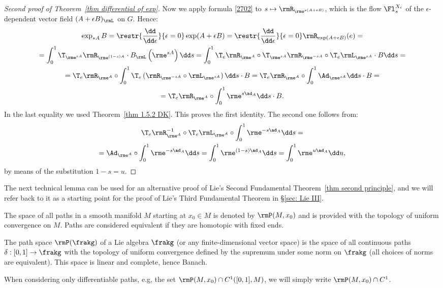 \begin{proof}[Second proof of Theorem~\ref{thm differential of exp}]
    Now we apply formula \eqref{2702} to $s\mapsto \rmR_{\rme^{s(A+\epsilon B)}}$, which is the flow $\Fl^{X_\epsilon}_s$ of the $\epsilon$-dependent vector field $(A+\epsilon B)_\rmL$ on $G$. Hence:
    \begin{multline}
        \exp_{\ast A}B=\restr{\frac{\dd}{\dd \epsilon}}{\epsilon=0}\exp(A+\epsilon B)=\restr{\frac{\dd}{\dd \epsilon}}{\epsilon=0}\rmR_{\exp(A+\epsilon B)}(e)=\\
        =\int_0^1\T_{\rme^{sA}}\rmR_{\rme^{(1-s)A}}\cdot B_\rmL\left(\rme^{sA}\right)\dd s=
        \int_0^1 \T_e \rmR_{\rme^A}\circ \T_{\rme^{sA}}\rmR_{\rme^{-sA}}\circ \T_e \rmL_{\rme^{sA}}\cdot B \dd s=\\
        =\T_e \rmR_{\rme^A}\circ\int_0^1 \T_e\left(\rmR_{\rme^{-sA}}\circ \rmL_{\rme^{sA}}\right)\dd s \cdot B=
        \T_e \rmR_{\rme^A}\circ \int_0^1 \Ad_{\rme^{sA}}\dd s\cdot B=\\
        =\T_e\rmR_{\rme^A}\circ \int_0^1 \rme^{s\ad_A}\dd s\cdot B.
    \end{multline}
    In the last equality we used Theorem~\ref{thm 1.5.2 DK}. This proves the first identity. The second one follows from:
    \begin{multline}
        \T_e \rmR_{\rme^A}^{-1}\circ \T_e\rmL_{\rme^A}\circ \int_0^1 \rme^{-s\ad_A}\dd s=\\
        =\Ad_{\rme^A}\circ\int_0^1 \rme^{-s\ad_A}\dd s=\int_0^1 \rme^{(1-s)\ad_A}\dd s=\int_0^1 \rme^{u\ad_A}\dd u,
    \end{multline}
    by means of the substitution $1-s=u$.
\end{proof}

The next technical lemma can be used for an alternative proof of Lie's Second Fundamental Theorem~\ref{thm second principle}, and we will refer back to it as a starting point for the proof of Lie's Third Fundamental Theorem in \S\ref{sec: Lie III}.

\begin{defn}
    The space of all paths in a smooth manifold $M$ starting at $x_0\in M$ is denoted by $\rmP(M,x_0)$ and is provided with the topology of uniform convergence on $M$. Paths are considered equivalent if they are homotopic with fixed ends.

    The path space $\rmP(\frakg)$ of a Lie algebra $\frakg$ (or any finite-dimensional vector space) is the space of all continuous paths $\delta:[0,1]\to \frakg$ with the topology of uniform convergence defined by the supremum under some norm on $\frakg$ (all choices of norms are equivalent). This space is linear and complete, hence Banach.

    When considering only differentiable paths, e.g, the set $\rmP(M,x_0)\cap C^1([0,1],M)$, we will simply write $\rmP(M,x_0)\cap C^1$. 
\end{defn}

